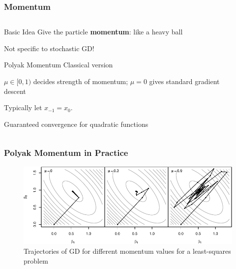 \documentclass[aspectratio=1610,onlytextwidth]{beamer}
\begin{document}
\begin{frame}
  \frametitle{Momentum}

  \begin{columns}
    \begin{column}{0.45\textwidth}
      \begin{block}{Basic Idea}
        Give the particle \textbf{momentum}: like a heavy ball

        \medskip

        Not specific to stochastic GD!
      \end{block}

      \pause

      \begin{block}{Polyak Momentum}
        Classical version

        \medskip

        $\mu \in [0, 1)$ decides strength of momentum; $\mu = 0$ gives standard gradient descent

        \medskip

        Typically let $x_{-1} = x_{0}$.

        \medskip

        Guaranteed convergence for quadratic functions
      \end{block}
    \end{column}
    \begin{column}{0.45\textwidth}
      \begin{algorithm}[H]
        \KwData{$\gamma >0$, $\mu \in [0,1)$}
        \caption{GD with Polyak Momentum}
      \end{algorithm}
    \end{column}
  \end{columns}

\end{frame}

\begin{frame}[c]
  \frametitle{Polyak Momentum in Practice}

  \begin{figure}[htpb]
    \centering
    \includegraphics[]{images/momentum-surface.pdf}
    \caption{%
      Trajectories of GD for different momentum values for a least-squares problem
    }
  \end{figure}

\end{frame}
\end{document}
